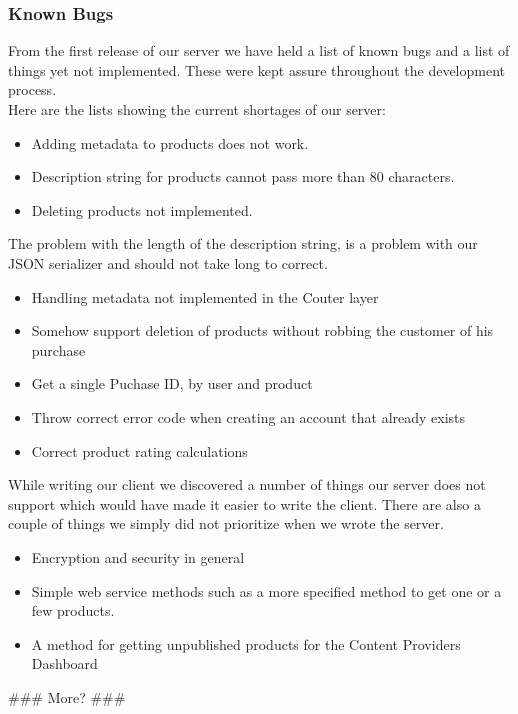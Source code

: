 \subsubsection{Known Bugs}
From the first release of our server we have held a list of known bugs and a list of things yet not implemented. These were kept assure throughout the development process.
\\Here are the lists showing the current shortages of our server:
\begin{itemize}
\item Adding metadata to products does not work.
\item Description string for products cannot pass more than 80 characters.
\item Deleting products not implemented.
\end{itemize}
The problem with the length of the description string, is a problem with our JSON serializer and should not take long to correct.
\begin{itemize}
\item Handling metadata not implemented in the C\Sh outer layer
\item Somehow support deletion of products without robbing the customer of his purchase
\item Get a single Puchase ID, by user and product
\item Throw correct error code when creating an account that already exists
\item Correct product rating calculations
\end{itemize}
While writing our client we discovered a number of things our server does not support which would have made it easier to write the client. There are also a couple of things we simply did not prioritize when we wrote the server.
\begin{itemize}
\item Encryption and security in general
\item Simple web service methods such as a more specified method to get one or a few products.
\item A method for getting unpublished products for the Content Providers Dashboard
\end{itemize}
\#\#\# More? \#\#\#
